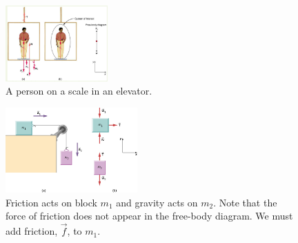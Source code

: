 \documentclass{article}
\begin{document}
\begin{figure}
\centering
\includegraphics[width=0.35\textwidth,trim=13cm 0cm 0cm 0cm,clip=true]{figures/elevator.png}
\caption{\label{fig:1} A person on a scale in an elevator.}
\end{figure}

\begin{figure}
\centering
\includegraphics[width=0.45\textwidth]{figures/blocks.jpg}
\caption{\label{fig:3} Friction acts on block $m_1$ and gravity acts on $m_2$.  Note that the force of friction does not appear in the free-body diagram.  We must add friction, $\vec{f}$, to $m_1$.}
\end{figure}
\end{document}
